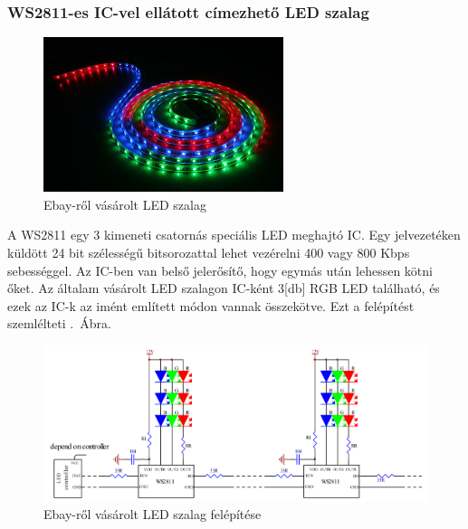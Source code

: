 \documentclass[../main.tex]{subfiles}
\begin{document}
        \subsubsection{WS2811-es IC-vel ellátott címezhető LED szalag}
            
            \begin{figure}[h!]
                \centering
                    \includegraphics[width=7cm]{resources/pcb_res/ledstrip}
                \caption{Ebay-ről vásárolt LED szalag}
                \label{fig:ledstrip}
            \end{figure}
        
            A WS2811 egy 3 kimeneti csatornás speciális LED meghajtó IC. Egy jelvezetéken küldött 24 bit szélességű bitsorozattal lehet vezérelni 400 vagy 800 Kbps sebességgel. Az IC-ben van belső jelerősítő, hogy egymás után lehessen kötni őket. Az általam vásárolt LED szalagon IC-ként 3[db] RGB LED található, és ezek az IC-k az imént említett módon vannak összekötve. Ezt a felépítést szemlélteti .~Ábra.\\[12px]
            
            \begin{figure}[h!] %
                \centering
                \includegraphics[width=14cm]{resources/pcb_res/ledstrip_schematic.png}
                \caption{Ebay-ről vásárolt LED szalag felépítése}
                \label{fig:ledstrip_schematic}
            \end{figure}
            
\end{document}
